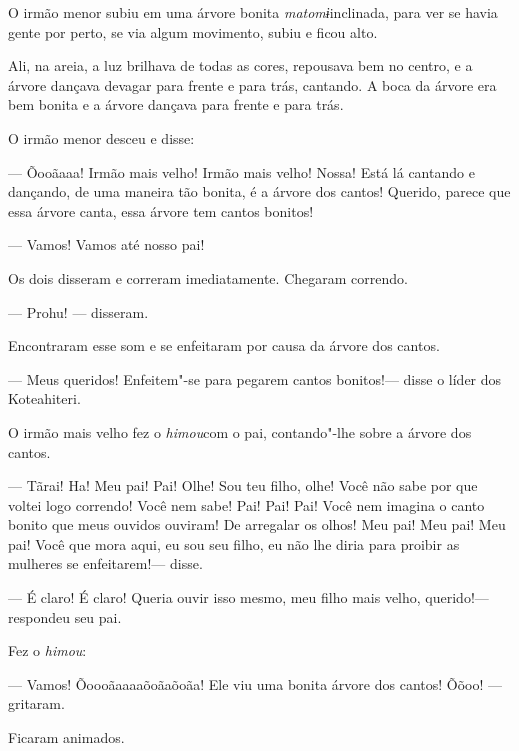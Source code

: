 O irmão menor subiu em uma árvore bonita \emph{matomɨ}inclinada, para
ver se havia gente por perto, se via algum movimento, subiu e ficou
alto. 

Ali, na areia, a luz brilhava de todas as cores, repousava bem no
centro, e a árvore dançava devagar para frente e para trás, cantando. A boca da árvore era bem bonita e a árvore dançava para frente e para
trás. 

O irmão menor desceu e disse:

--- Õooãaaa! Irmão mais velho! Irmão mais velho! Nossa! Está lá cantando
e dançando, de uma maneira tão bonita, é a árvore dos cantos! Querido,
parece que essa árvore canta, essa árvore tem cantos bonitos! 

--- Vamos! Vamos até nosso pai! 

Os dois disseram e correram imediatamente. Chegaram correndo.

--- Prohu! --- disseram. 

Encontraram esse som e se enfeitaram por causa da árvore dos cantos. 

--- Meus queridos! Enfeitem"-se para pegarem cantos bonitos!--- disse o
líder dos Koteahiteri. 

O irmão mais velho fez o \emph{himou}com o pai, contando"-lhe sobre a
árvore dos cantos. 

--- Tãrai! Ha! Meu pai! Pai! Olhe! Sou teu filho, olhe! Você não sabe
por que voltei logo correndo! Você nem sabe! Pai! Pai! Pai! Você nem
imagina o canto bonito que meus ouvidos ouviram! De arregalar os olhos!
Meu pai! Meu pai! Meu pai! Você que mora aqui, eu sou seu filho, eu não
lhe diria para proibir as mulheres se enfeitarem!--- disse. 

--- É claro! É claro! Queria ouvir isso mesmo, meu filho mais velho,
querido!--- respondeu seu pai. 

Fez o \emph{himou}: 

--- Vamos! Õoooãaaaaõoãaõoãa! Ele viu uma bonita árvore dos cantos!
Õõoo! --- gritaram. 

Ficaram animados.

 

